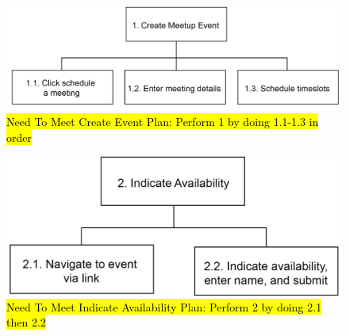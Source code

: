 \documentclass{sigchi}
\begin{document}
\begin{figure}
  \centering
  \includegraphics[width=1.75\columnwidth]{figures/NeedToMeet/HTA_host}
  \caption{\hl{Need To Meet Create Event Plan: Perform 1 by doing 1.1-1.3 in order}}
    \label{NeedToMeetHTA_Host}
\end{figure}

\begin{figure}
  \centering
  \includegraphics[width=1.75\columnwidth]{figures/NeedToMeet/HTA_attend}
  \caption{\hl{Need To Meet Indicate Availability Plan: Perform 2 by doing 2.1 then 2.2}}
    \label{NeedToMeetHTA_attend}
\end{figure}
\end{document}
